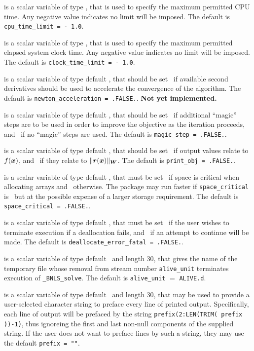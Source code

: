 \documentclass{galahad}
\newcommand{\packagename}{BNLS}
\newcommand{\fullpackagename}{\libraryname\_\packagename}
\newcommand{\solver}{{\tt \fullpackagename\_solve}}
\begin{document}
\begin{description}
 is a scalar variable of type \realdp,
that is used to specify the maximum permitted CPU time. Any negative
value indicates no limit will be imposed. The default is
{\tt cpu\_time\_limit = - 1.0}.

 is a scalar variable of type \realdp,
that is used to specify the maximum permitted elapsed system clock time.
Any negative value indicates no limit will be imposed. The default is
{\tt clock\_time\_limit = - 1.0}.

is a scalar variable of type default \logical,
that should be set \true\ if available  second derivatives should 
be used to accelerate the convergence of the algorithm.
The default is {\tt newton\_acceleration = .FALSE.}.
{\bf Not yet implemented.}

is a scalar variable of type default \logical,
that should be set \true\ if additional ``magic'' steps are to be
used in order to improve the objective as the iteration proceeds,
and \false\ if no ``magic'' steps are used.
The default is {\tt magic\_step = .FALSE.}.

is a scalar variable of type default \logical,
that should be set \true\ if output values relate to $f({\bm{x}})$,
and \false\ if they relate to $\|{\bm{r}}({\bm{x}})\|_{{\bm{W}}}$.
The default is {\tt print\_obj = .FALSE.}.

 is a scalar variable of type default \logical,
that must be set \true\ if space is critical when allocating arrays
and  \false\ otherwise. The package may run faster if
{\tt space\_critical} is \false\ but at the possible expense of a larger
storage requirement. The default is {\tt space\_critical = .FALSE.}.

 is a scalar variable of type default \logical,
that must be set \true\ if the user wishes to terminate execution if
a deallocation  fails, and \false\ if an attempt to continue
will be made. The default is {\tt deallocate\_error\_fatal = .FALSE.}.

 is a scalar variable of type default \character\ and length
30, that gives the name of the temporary file whose removal from stream number
{\tt alive\_unit} terminates execution of \solver.
The default is {\tt alive\_unit} $=$ {\tt ALIVE.d}.

 is a scalar variable of type default \character\
and length 30, that may be used to provide a user-selected
character string to preface every line of printed output.
Specifically, each line of output will be prefaced by the string
{\tt prefix(2:LEN(TRIM( prefix ))-1)},
thus ignoreing the first and last non-null components of the
supplied string. If the user does not want to preface lines by such
a string, they may use the default {\tt prefix = ""}.


\end{description}
\end{document}
